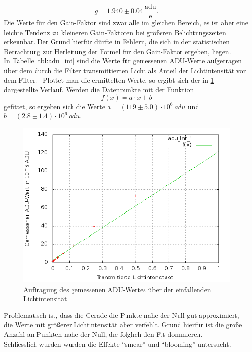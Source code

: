 \begin{equation}
\bar{g} = 1.940 \pm 0.04 \ \frac{\mathrm{adu}}{\mathrm{e}}. 
\end{equation}
Die Werte für den Gain-Faktor sind zwar alle im gleichen Bereich, es ist aber eine leichte Tendenz zu kleineren Gain-Faktoren bei größeren Belichtungszeiten erkennbar. Der Grund hierfür dürfte in Fehlern, die sich in der statistischen Betrachtung zur Herleitung der Formel für den Gain-Faktor ergeben, liegen. \\
In Tabelle \ref{tbl:adu_int} sind die Werte für gemessenen ADU-Werte aufgetragen über dem durch die Filter transmittierten Licht als Anteil der Lichtintensität vor dem Filter. \
Plottet man die ermittelten Werte, so ergibt sich der in \ref{plot:adu_int} dargestellte Verlauf. Werden die Datenpunkte mit der Funktion 
\begin{equation}
f(x) = a \cdot x + b
\end{equation}
gefittet, so ergeben sich die Werte $a = (119 \pm 5.0) \cdot 10^6 \ adu$ und $b = (2.8 \pm 1.4) \cdot 10^6 \ adu$.
\begin{figure}[h!]
\centering
        \includegraphics[width=.9\textwidth]{adu_int_.png}
\caption{ Auftragung des gemessenen ADU-Wertes über der einfallenden Lichtintensität }
\label{plot:adu_int}
\end{figure}
Problematisch ist, dass die Gerade die Punkte nahe der Null gut approximiert, die Werte mit größerer Lichtintensität aber verfehlt. Grund hierfür ist die große Anzahl an Punkten nahe der Null, die folglich den Fit dominieren. \\
Schliesslich wurden wurden die Effekte \enquote{smear} und \enquote{blooming} untersucht. 

